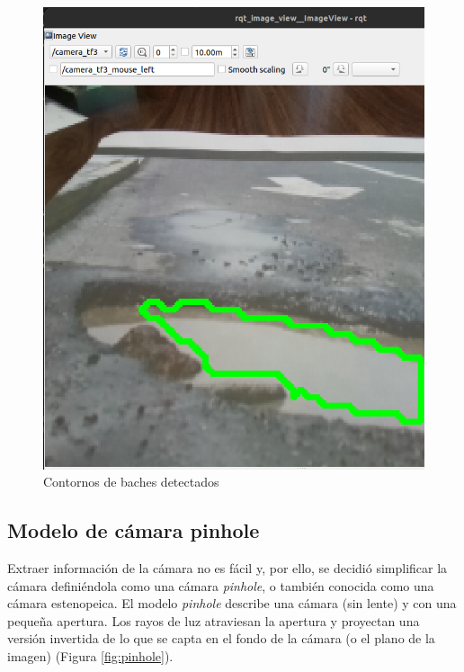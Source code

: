 \begin{figure}[ht!]
\begin{minipage}{0.3\linewidth}
		\includegraphics[width=\linewidth]{figs/cap6/contornobache2.png}
	\end{minipage}
	\caption{Contornos de baches detectados}
	\label{fig:contornobache}
\end{figure}

\subsection{Modelo de cámara pinhole}
\label{subsec:softwarehsuelo}

Extraer información de la cámara no es fácil y, por ello, se decidió simplificar la cámara definiéndola como una cámara \textit{pinhole}, o también conocida como una cámara estenopeica. El modelo \textit{pinhole} describe una cámara (sin lente) y con una pequeña apertura. Los rayos de luz atraviesan la apertura y proyectan una versión invertida de lo que se capta en el fondo de la cámara (o el plano de la imagen) (Figura \ref{fig:pinhole}).

